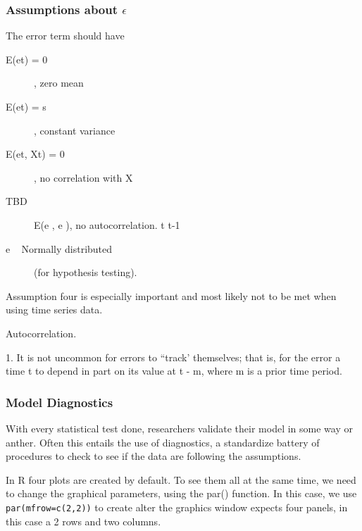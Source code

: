 \documentclass{article}\usepackage[]{graphicx}\usepackage[]{color}
\begin{document}

\subsubsection{Assumptions about $\epsilon$}

The error term should have 


\begin{description}
  \item [E(et) = 0], zero mean

  \item[E(et) = s], constant variance

  \item[E(et, Xt) = 0] , no correlation with X 

  \item[TBD] E(e , e ), no autocorrelation. t t-1

  \item[e ~ Normally distributed] (for hypothesis testing). 

\end{description}

Assumption four is especially important and most likely not to be met when using time series data.

Autocorrelation.

1. It is not uncommon for errors to “track’ themselves; that is, for the error a time t to depend in part on its value at t - m, where m is a prior time period.

\subsubsection{Model Diagnostics}

With every statistical test done, researchers validate their model in some way or anther. Often this entails the use of diagnostics, a standardize battery of procedures to check to see if the data are following the assumptions. 

In R four plots are created by default.  To see them all at the same time, we need to change the graphical parameters, using the par() function. In this case, we use \texttt{par(mfrow=c(2,2))} to create alter the graphics window expects four panels, in this case a 2 rows and two columns.
\end{document}

